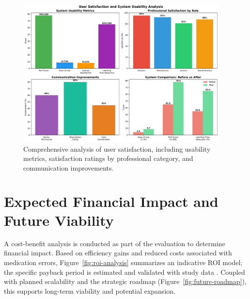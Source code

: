 \begin{figure}[htbp]
    \centering
    \includegraphics[width=0.95\textwidth]{images/generated/user_satisfaction.png}
    \caption{Comprehensive analysis of user satisfaction, including usability metrics, satisfaction ratings by professional category, and communication improvements.}
    \label{fig:user-satisfaction}
\end{figure}

\section{Expected Financial Impact and Future Viability}

A cost-benefit analysis is conducted as part of the evaluation to determine financial impact. Based on efficiency gains and reduced costs associated with medication errors, Figure~\ref{fig:roi-analysis} summarizes an indicative ROI model; the specific payback period is estimated and validated with study data \cite{adler2021}. Coupled with planned scalability and the strategic roadmap (Figure~\ref{fig:future-roadmap}), this supports long-term viability and potential expansion.

